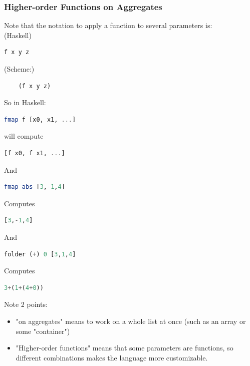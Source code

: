 \documentclass[12pt]{article}
\begin{document}
\subsubsection{Higher-order Functions on Aggregates}

Note that the notation to apply a function to several parameters is:
\\(Haskell)
\begin{lstlisting}[language=Haskell]
    f x y z
\end{lstlisting}
(Scheme:)
\begin{lstlisting}
    (f x y z)
\end{lstlisting}

So in Haskell:
\begin{lstlisting}[language=Haskell]
    fmap f [x0, x1, ...]
\end{lstlisting}

will compute

\begin{lstlisting}[language=Haskell]
    [f x0, f x1, ...]
\end{lstlisting}

And

\begin{lstlisting}[language=Haskell]
    fmap abs [3,-1,4]
\end{lstlisting}

Computes

\begin{lstlisting}[language=Haskell]
    [3,-1,4]
\end{lstlisting}

And 

\begin{lstlisting}[language=Haskell]
    folder (+) 0 [3,1,4]
\end{lstlisting}

Computes

\begin{lstlisting}[language=Haskell]
    3+(1+(4+0))
\end{lstlisting}

Note 2 points:
\begin{itemize}
    \item "on aggregates" means to work on a whole list at once (such as an array or some "container")
    \item "Higher-order functions" means that some parameters are functions, so different combinations makes the language more customizable.
\end{itemize}
\end{document}
